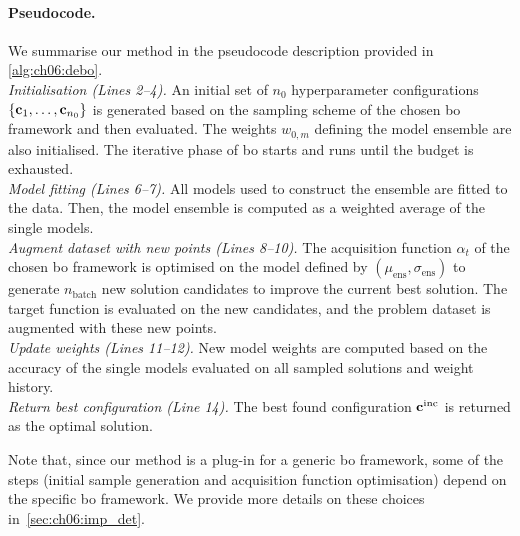\paragraph{Pseudocode.}
We summarise our method in the pseudocode description provided in \cref{alg:ch06:debo}. \\
\noindent\textit{Initialisation (Lines 2--4). }
An initial set of $n_0$ hyperparameter configurations
$\{\mathbf{c}_1,\ldots,\mathbf{c}_{n_0}\}$ is generated based on the sampling scheme of the chosen \gls{bo} framework and then evaluated. The weights $w_{0,m}$ defining the model ensemble are also initialised. The iterative phase of \gls{bo} starts and runs until the budget is exhausted.\\
\noindent\textit{Model fitting (Lines 6--7).}
All models used to construct the ensemble are fitted to the data. Then, the model ensemble is computed as a weighted average of the single models.\\
\noindent\textit{Augment dataset with new points (Lines 8--10). }
The acquisition function $\alpha_t$ of the chosen \gls{bo} framework
is optimised
on the model defined by $(\mu_\text{ens},\sigma_\text{ens})$
to generate $n_{\mathrm{batch}}$ new solution candidates to improve the current best solution.
The target function is evaluated on the new candidates, and the problem dataset is augmented with these new points.\\
\noindent\textit{Update weights (Lines 11--12).}
New model weights are computed based on the accuracy of the single models evaluated on all sampled solutions and weight history.\\
\noindent\textit{Return best configuration (Line 14).}
The best found configuration $\mathbf{c}^{\mathrm{inc}}$ is returned as the optimal solution.

Note that, since our method is a plug-in for a generic \gls{bo} framework, some of the steps (initial sample generation and acquisition function optimisation) depend on the specific \gls{bo} framework.
We provide more details on these choices in~\cref{sec:ch06:imp_det}.

